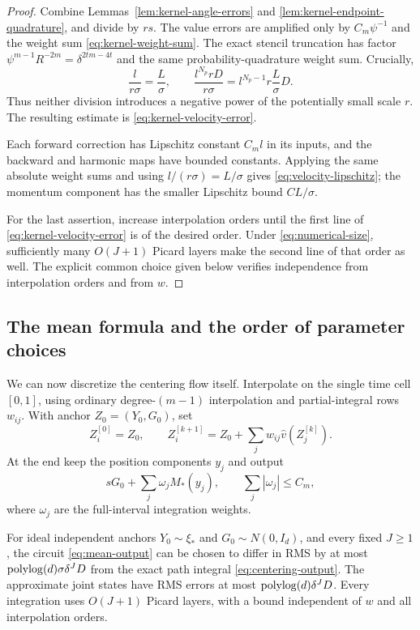 \begin{proof}
Combine Lemmas~\ref{lem:kernel-angle-errors} and
\ref{lem:kernel-endpoint-quadrature}, and divide by $rs$.  The value
errors are amplified only by $C_m\psi^{-1}$ and the weight sum
\eqref{eq:kernel-weight-sum}.  The exact stencil truncation has factor
$\psi^{m-1}R^{-2m}=\delta^{2tm-4t}$ and the same probability-quadrature
weight sum.  Crucially,
\[
 \frac{l}{r\sigma}=\frac L\sigma,\qquad
 \frac{l^{N_p}rD}{r\sigma}
       =l^{N_p-1}r\frac L\sigma D.
\]
Thus neither division introduces a negative power of the potentially
small scale $r$.  The resulting estimate is
\eqref{eq:kernel-velocity-error}.

Each forward correction has Lipschitz constant $C_ml$ in its inputs,
and the backward and harmonic maps have bounded constants.  Applying
the same absolute weight sums and using $l/(r\sigma)=L/\sigma$
gives \eqref{eq:velocity-lipschitz}; the momentum component has the
smaller Lipschitz bound $CL/\sigma$.

For the last assertion, increase interpolation orders until the first
line of \eqref{eq:kernel-velocity-error} is of the desired order.
Under \eqref{eq:numerical-size}, sufficiently many $O(J+1)$ Picard
layers make the second line of that order as well.  The explicit
common choice given below verifies independence from interpolation
orders and from $w$.
\end{proof}

\subsection{The mean formula and the order of parameter choices}

We can now discretize the centering flow itself.  Interpolate on the
single time cell $[0,1]$, using ordinary degree-$(m-1)$ interpolation
and partial-integral rows $w_{ij}$.  With anchor $Z_0=(Y_0,G_0)$, set
\[
 Z_i^{[0]}=Z_0,\qquad
 Z_i^{[k+1]}=Z_0+\sum_jw_{ij}\widehat v(Z_j^{[k]}).
\]
At the end keep the position components $y_j$ and output
\begin{equation}\label{eq:mean-output}
 sG_0+\sum_j\omega_jM_*(y_j),
 \qquad \sum_j|\omega_j|\le C_m,
\end{equation}
where $\omega_j$ are the full-interval integration weights.

\begin{proposition}\label{prop:mean-circuit}
For ideal independent anchors $Y_0\sim\xi_*$ and $G_0\sim N(0,I_d)$,
and every fixed $J\ge1$, the circuit \eqref{eq:mean-output} can be
chosen to differ in RMS by at most
$\operatorname{polylog}(d)\sigma\delta^J D$ from the exact path integral
\eqref{eq:centering-output}.  The approximate joint states have RMS
errors at most $\operatorname{polylog}(d)\delta^JD$.  Every integration uses
$O(J+1)$ Picard layers, with a bound independent of $w$ and all
interpolation orders.
\end{proposition}


